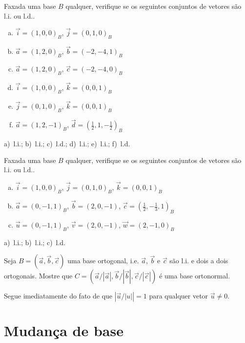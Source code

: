 \begin{exer}
  Faxada uma base $B$ qualquer, verifique se os seguintes conjuntos de vetores são l.i. ou l.d..
  \begin{enumerate}[a)]
  \item $\vec{i}=(1,0,0)_B$, $\vec{j}=(0,1,0)_B$
  \item $\vec{a}=(1,2,0)_B$, $\vec{b}=(-2,-4,1)_B$
  \item $\vec{a}=(1,2,0)_B$, $\vec{c}=(-2,-4,0)_B$
  \item $\vec{i}=(1,0,0)_B$, $\vec{k}=(0,0,1)_B$
  \item $\vec{j}=(0,1,0)_B$, $\vec{k}=(0,0,1)_B$
  \item $\vec{a}=(1,2,-1)_B$, $\vec{d}=(\frac{1}{2},1,-\frac{1}{2})_B$
  \end{enumerate}
\end{exer}
\begin{resp}
  a)~l.i.; b)~l.i.; c)~l.d.; d)~l.i.; e)~l.i.; f)~l.d.
\end{resp}

\begin{exer}
  Faxada uma base $B$ qualquer, verifique se os seguintes conjuntos de vetores são l.i. ou l.d..
  \begin{enumerate}[a)]
  \item $\vec{i}=(1,0,0)_B$, $\vec{j}=(0,1,0)_B$, $\vec{k}=(0,0,1)_B$
  \item $\vec{a}=(0,-1,1)_B$, $\vec{b}=(2,0,-1)$, $\vec{c}=(\frac{1}{2},-\frac{1}{3},1)_B$
  \item $\vec{u}=(0,-1,1)_B$, $\vec{v}=(2,0,-1)$, $\vec{w}=(2,-1,0)_B$
  \end{enumerate}
\end{exer}
\begin{resp}
  a)~l.i.; b)~l.i.; c)~l.d.
\end{resp}

\begin{exer}
  Seja $B = (\vec{a}, \vec{b}, \vec{c})$ uma base ortogonal, i.e. $\vec{a}$, $\vec{b}$ e $\vec{c}$ são l.i. e dois a dois ortogonais. Mostre que $C = (\vec{a}/|\vec{a}|,\vec{b}/|\vec{b}|,\vec{c}/|\vec{c}|)$ é uma base ortonormal.
\end{exer}
\begin{resp}
  Segue imediatamente do fato de que $\left|\vec{u}/|u|\right|=1$ para qualquer vetor $\vec{u}\neq 0$.
\end{resp}


\section{Mudança de base}\label{cap_base_sec_mudbas}

